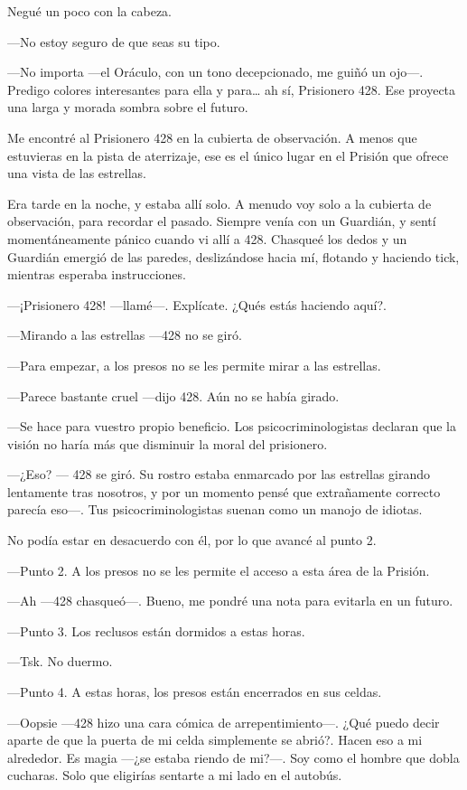 Negué un poco con la cabeza.

---No estoy seguro de que seas su tipo.

---No importa ---el Oráculo, con un tono decepcionado, me guiñó un
ojo---. Predigo colores interesantes para ella y para\ldots{} ah sí,
Prisionero 428. Ese proyecta una larga y morada sombra sobre el futuro.

Me encontré al Prisionero 428 en la cubierta de observación. A menos que
estuvieras en la pista de aterrizaje, ese es el único lugar en el
Prisión que ofrece una vista de las estrellas.

Era tarde en la noche, y estaba allí solo. A menudo voy solo a la
cubierta de observación, para recordar el pasado. Siempre venía con un
Guardián, y sentí momentáneamente pánico cuando vi allí a 428. Chasqueé
los dedos y un Guardián emergió de las paredes, deslizándose hacia mí,
flotando y haciendo tick, mientras esperaba instrucciones.

---¡Prisionero 428! ---llamé---. Explícate. ¿Qués estás haciendo aquí?.

---Mirando a las estrellas ---428 no se giró.

---Para empezar, a los presos no se les permite mirar a las estrellas.

---Parece bastante cruel ---dijo 428. Aún no se había girado.

---Se hace para vuestro propio beneficio. Los psicocriminologistas
declaran que la visión no haría más que disminuir la moral del
prisionero.

---¿Eso? --- 428 se giró. Su rostro estaba enmarcado por las estrellas
girando lentamente tras nosotros, y por un momento pensé que
extrañamente correcto parecía eso---. Tus psicocriminologistas suenan
como un manojo de idiotas.

No podía estar en desacuerdo con él, por lo que avancé al punto 2.

---Punto 2. A los presos no se les permite el acceso a esta área de la
Prisión.

---Ah ---428 chasqueó---. Bueno, me pondré una nota para evitarla en un
futuro.

---Punto 3. Los reclusos están dormidos a estas horas.

---Tsk. No duermo.

---Punto 4. A estas horas, los presos están encerrados en sus celdas.

---Oopsie ---428 hizo una cara cómica de arrepentimiento---. ¿Qué puedo
decir aparte de que la puerta de mi celda simplemente se abrió?. Hacen
eso a mi alrededor. Es magia ---¿se estaba riendo de mi?---. Soy como el
hombre que dobla cucharas. Solo que eligirías sentarte a mi lado en el
autobús.

